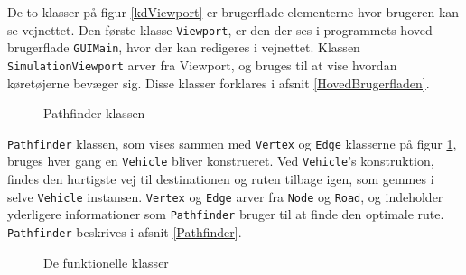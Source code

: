 De to klasser på figur \ref{kdViewport} er brugerflade elementerne hvor brugeren kan se vejnettet. Den første klasse \texttt{Viewport}, er den der ses i programmets hoved brugerflade \texttt{GUIMain}, hvor der kan redigeres i vejnettet. Klassen \texttt{SimulationViewport} arver fra Viewport, og bruges til at vise hvordan køretøjerne bevæger sig. Disse klasser forklares i afsnit \ref{HovedBrugerfladen}.

\begin{figure}[H]
    \centering
    \caption{Pathfinder klassen}
    \label{kdPathfinder}
\end{figure}

\texttt{Pathfinder} klassen, som vises sammen med \texttt{Vertex} og \texttt{Edge} klasserne på figur \ref{kdPathfinder}, bruges hver gang en \texttt{Vehicle} bliver konstrueret. Ved \texttt{Vehicle}'s konstruktion, findes den hurtigste vej til destinationen og ruten tilbage igen, som gemmes i selve \texttt{Vehicle} instansen. \texttt{Vertex} og \texttt{Edge} arver fra \texttt{Node} og \texttt{Road}, og indeholder yderligere informationer som \texttt{Pathfinder} bruger til at finde den optimale rute. \texttt{Pathfinder} beskrives i afsnit \ref{Pathfinder}.

\begin{figure}[H]
    \centering
    \caption{De funktionelle klasser}
    \label{kdFunktionelle}
\end{figure}

